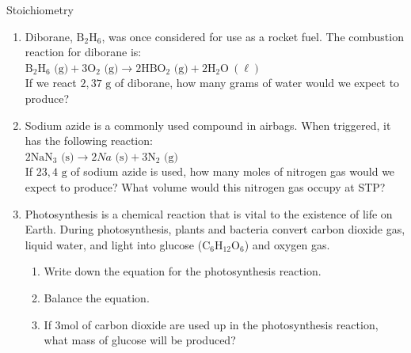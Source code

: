    \noindent
            \begin{exercises}{  Stoichiometry
      }
            \nopagebreak \noindent
      \label{m38712*id285393}\begin{enumerate}[noitemsep, label=\textbf{\arabic*}. ] 
            \label{m38712*uid101}\item Diborane, $\text{B}{}_{2}\text{H}{}_{6}$, was once considered for use as a rocket fuel. The combustion reaction for diborane is:\\
${\text{B}}_{2}{\text{H}}_{6} \text{ (g)} + 3{\text{O}}_{2} \text{ (g)} \to 2\text{H}\text{B}{\text{O}}_{2} \text{ (g)} + 2{\text{H}}_{2}\text{O} ~\left( \ell \right)$\\
If we react $2,37 \text{ g}$ of diborane, how many grams of water would we expect to produce?
\item Sodium azide is a commonly used compound in airbags. When triggered, it has the following reaction:\\
$2{\text{NaN}}_{3} \text{ (s)} \to 2Na \text{ (s)} + 3{\text{N}}_{2} \text{ (g)}$\\
If $23,4 \text{ g}$ of sodium azide is used, how many moles of nitrogen gas would we expect to produce? What volume would this nitrogen gas occupy at STP?\newline
\label{m38712*uid103}\item Photosynthesis is a chemical reaction that is vital to the existence of life on Earth. During photosynthesis, plants and bacteria convert carbon dioxide gas, liquid water, and light into glucose ($\text{C}{}_{6}\text{H}{}_{12}\text{O}{}_{6}$) and oxygen gas.
\label{m38712*id285674}\begin{enumerate}[noitemsep, label=\textbf{\alph*}. ] 
            \label{m38712*uid104}\item Write down the equation for the photosynthesis reaction.
\label{m38712*uid105}\item Balance the equation.
\label{m38712*uid106}\item If $3 \text{mol}$ of carbon dioxide are used up in the photosynthesis reaction, what mass of glucose will be produced?

\end{enumerate}
\end{enumerate}
\end{exercises}
